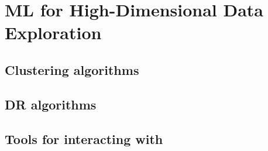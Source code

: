 \chapter{ML for High-Dimensional Data Exploration}
\label{chapter3}

\graphicspath{{Chapter3/figs/}}

\ifpdf
    \graphicspath{{Chapter3/Figs/Raster/}{Chapter3/Figs/PDF/}{Chapter3/Figs/}}
\else
    \graphicspath{{Chapter3/Figs/Vector/}{Chapter3/Figs/}}
\fi

\section{Clustering algorithms} %
\label{section3.1}



\section{DR algorithms} %
\label{section3.2}



\section{Tools for interacting with} %
\label{section3.3}

